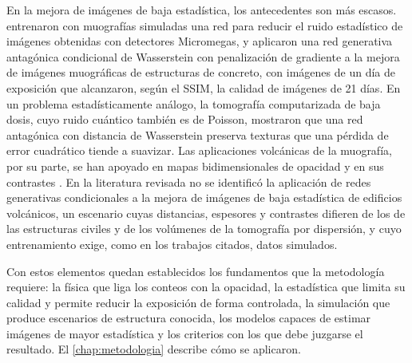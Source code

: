 En la mejora de imágenes de baja estadística, los antecedentes son más escasos. \textcite{lefevre2024} entrenaron con muografías simuladas una red para reducir el ruido estadístico de imágenes obtenidas con detectores Micromegas, y \textcite{odonnell2025particles} aplicaron una red generativa antagónica condicional de Wasserstein con penalización de gradiente a la mejora de imágenes muográficas de estructuras de concreto, con imágenes de un día de exposición que alcanzaron, según el SSIM, la calidad de imágenes de 21 días. En un problema estadísticamente análogo, la tomografía computarizada de baja dosis, cuyo ruido cuántico también es de Poisson, \textcite{yang2018} mostraron que una red antagónica con distancia de Wasserstein preserva texturas que una pérdida de error cuadrático tiende a suavizar. Las aplicaciones volcánicas de la muografía, por su parte, se han apoyado en mapas bidimensionales de opacidad y en sus contrastes \parencite{tanaka2007asama,olah2018sakurajima,tanaka2023muography}. En la literatura revisada no se identificó la aplicación de redes generativas condicionales a la mejora de imágenes de baja estadística de edificios volcánicos, un escenario cuyas distancias, espesores y contrastes difieren de los de las estructuras civiles y de los volúmenes de la tomografía por dispersión, y cuyo entrenamiento exige, como en los trabajos citados, datos simulados.

Con estos elementos quedan establecidos los fundamentos que la metodología requiere: la física que liga los conteos con la opacidad, la estadística que limita su calidad y permite reducir la exposición de forma controlada, la simulación que produce escenarios de estructura conocida, los modelos capaces de estimar imágenes de mayor estadística y los criterios con los que debe juzgarse el resultado. El \cref{chap:metodologia} describe cómo se aplicaron.
